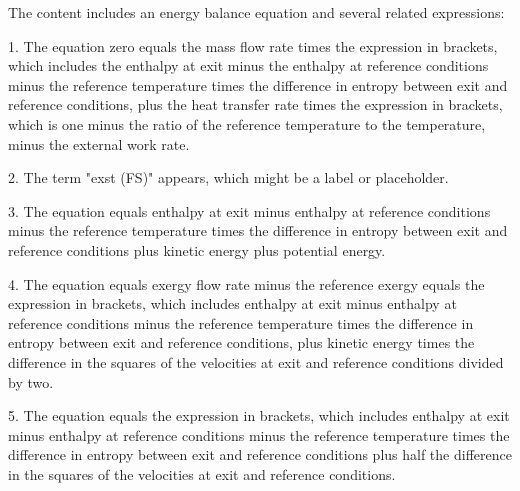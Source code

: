 The content includes an energy balance equation and several related expressions:

1. The equation zero equals the mass flow rate times the expression in brackets, which includes the enthalpy at exit minus the enthalpy at reference conditions minus the reference temperature times the difference in entropy between exit and reference conditions, plus the heat transfer rate times the expression in brackets, which is one minus the ratio of the reference temperature to the temperature, minus the external work rate.

2. The term "exst (FS)" appears, which might be a label or placeholder.

3. The equation equals enthalpy at exit minus enthalpy at reference conditions minus the reference temperature times the difference in entropy between exit and reference conditions plus kinetic energy plus potential energy.

4. The equation equals exergy flow rate minus the reference exergy equals the expression in brackets, which includes enthalpy at exit minus enthalpy at reference conditions minus the reference temperature times the difference in entropy between exit and reference conditions, plus kinetic energy times the difference in the squares of the velocities at exit and reference conditions divided by two.

5. The equation equals the expression in brackets, which includes enthalpy at exit minus enthalpy at reference conditions minus the reference temperature times the difference in entropy between exit and reference conditions plus half the difference in the squares of the velocities at exit and reference conditions.